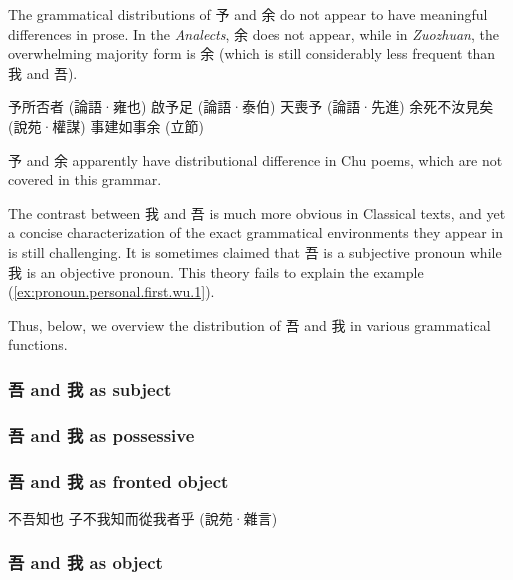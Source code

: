 \documentclass[UTF8, a4paper, oneside, scheme=plain, 12pt]{ctexrep}
\newcommand{\work}[1]{\textit{#1}}
\begin{document}
The grammatical distributions of 予 and 余 do not appear to have meaningful differences in prose.
In the \work{Analects}, 余 does not appear,
while in \work{Zuozhuan}, the overwhelming majority form is 余 (which is still considerably less frequent than 我 and 吾).

\begin{exe}
    \ex 予所否者 \hfill (論語·雍也)
    \ex 啟予足 \hfill (論語·泰伯)
    \ex 天喪予 \hfill (論語·先進)
    \ex 余死不汝見矣 \hfill (說苑·權謀)
    \ex 事建如事余 \hfill (立節)
\end{exe}

予 and 余 apparently have distributional difference in Chu poems, which are not covered in this grammar.

The contrast between 我 and 吾 is much more obvious in Classical texts,
and yet a concise characterization of the exact grammatical environments they appear in is still challenging.
It is sometimes claimed that 吾 is a subjective pronoun while 我 is an objective pronoun.
This theory fails to explain the example (\ref{ex:pronoun.personal.first.wu.1}).




Thus, below, we overview the distribution of 吾 and 我 in various grammatical functions.

\subsubsection{吾 and 我 as subject}



\subsubsection{吾 and 我 as possessive}

\subsubsection{吾 and 我 as fronted object}

\begin{exe}
    \ex\label{ex:pronoun.personal.first.wu.1} 不吾知也
    \ex\label{ex:pronoun.personal.first.fronted-object.2} 子不我知而從我者乎 \hfill (說苑·雜言)
\end{exe}

\subsubsection{吾 and 我 as object}
\end{document}
